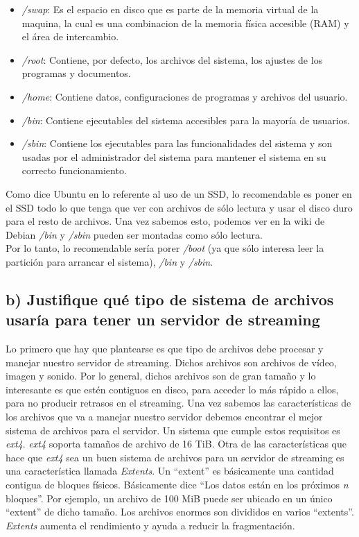 \documentclass[a4paper,titlepage,12pt]{scrartcl}	%
\numberwithin{figure}{section} %
\numberwithin{table}{section} %
\begin{document}
	\begin{itemize}
		\item \textit{/swap}: Es el espacio en disco que es parte de la memoria virtual de la maquina, la cual es una combinacion de la memoria física accesible (RAM) y el área de intercambio.
		\item \textit{/root}: Contiene, por defecto, los archivos del sistema, los ajustes de los programas y documentos.
		\item \textit{/home}: Contiene datos, configuraciones de programas y archivos del usuario.
		\item \textit{/bin}: Contiene ejecutables del sistema accesibles para la mayoría de usuarios.
		\item \textit{/sbin}: Contiene los ejecutables para las funcionalidades del sistema y son usadas por el administrador del sistema para mantener el sistema en su correcto funcionamiento.
	\end{itemize}
	
	Como dice Ubuntu \cite{ssd} en lo referente al uso de un SSD, lo recomendable es poner en el SSD todo lo que tenga que ver con archivos de sólo lectura y usar el disco duro para el resto de archivos. Una vez sabemos esto, podemos ver en la wiki de Debian \cite{ReadonlyRoot} \textit{/bin} y \textit{/sbin} pueden ser montadas como sólo lectura. \\
	
	Por lo tanto, lo recomendable sería porer \textit{/boot} (ya que sólo interesa leer la partición para arrancar el sistema), \textit{/bin} y \textit{/sbin}.
	
	\subsection[b) Justifique qué tipo de sistema de archivos usaría para tener un servidor de streaming]{b) Justifique qué tipo de sistema de archivos usaría para tener un servidor de streaming}
	
	Lo primero que hay que plantearse es que tipo de archivos debe procesar y manejar nuestro servidor de streaming. Dichos archivos son archivos de vídeo, imagen y sonido. Por lo general, dichos archivos son de gran tamaño y lo interesante es que estén contiguos en disco, para acceder lo más rápido a ellos, para no producir retrasos en el streaming. Una vez sabemos las características de los archivos que va a manejar nuestro servidor debemos encontrar el mejor sistema de archivos para el servidor. Un sistema que cumple estos requisitos es \textit{ext4}. \textit{ext4} soporta tamaños de archivo de 16 TiB. Otra de las características que hace que \textit{ext4} sea un buen sistema de archivos para un servidor de streaming es una característica llamada \textit{Extents}. Un ``extent'' es básicamente una cantidad contigua de bloques físicos. Básicamente dice ``Los datos están en los próximos \textit{n} bloques''. Por
	ejemplo, un archivo de 100 MiB puede ser ubicado en un único ``extent'' de dicho tamaño. Los archivos enormes son divididos en varios ``extents''. \textit{Extents} aumenta el rendimiento y ayuda a reducir la fragmentación. \cite{streaming}
	
\end{document}
